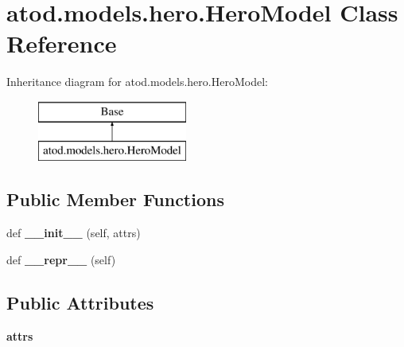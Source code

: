 \hypertarget{classatod_1_1models_1_1hero_1_1_hero_model}{}\section{atod.\+models.\+hero.\+Hero\+Model Class Reference}
\label{classatod_1_1models_1_1hero_1_1_hero_model}
Inheritance diagram for atod.\+models.\+hero.\+Hero\+Model\+:\begin{figure}[H]
\begin{center}
\leavevmode
\includegraphics[height=2.000000cm]{classatod_1_1models_1_1hero_1_1_hero_model}
\end{center}
\end{figure}
\subsection*{Public Member Functions}
\begin{DoxyCompactItemize}
\item 
def {\bfseries \+\_\+\+\_\+init\+\_\+\+\_\+} (self, attrs)\hypertarget{classatod_1_1models_1_1hero_1_1_hero_model_a2dbdaab336ce65033f13e21586d3c9c2}{}\label{classatod_1_1models_1_1hero_1_1_hero_model_a2dbdaab336ce65033f13e21586d3c9c2}

\item 
def {\bfseries \+\_\+\+\_\+repr\+\_\+\+\_\+} (self)\hypertarget{classatod_1_1models_1_1hero_1_1_hero_model_ab231395fb3d47764d3924aa9f300d6e0}{}\label{classatod_1_1models_1_1hero_1_1_hero_model_ab231395fb3d47764d3924aa9f300d6e0}

\end{DoxyCompactItemize}
\subsection*{Public Attributes}
\begin{DoxyCompactItemize}
\item 
{\bfseries attrs}\hypertarget{classatod_1_1models_1_1hero_1_1_hero_model_a10c17b5904721748f3759b46ecd00ebb}{}\label{classatod_1_1models_1_1hero_1_1_hero_model_a10c17b5904721748f3759b46ecd00ebb}

\end{DoxyCompactItemize}
